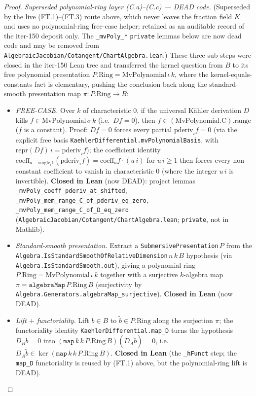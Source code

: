 \begin{proof}
  \emph{Superseded polynomial-ring layer (C.a)--(C.c) --- DEAD code.} (Superseded by the live (FT.1)--(FT.3) route above, which never leaves the fraction field \(K\) and uses no polynomial-ring free-case helper; retained as an auditable record of the iter-150 deposit only. The \texttt{\_mvPoly\_*} \texttt{private} lemmas below are now dead code and may be removed from \texttt{AlgebraicJacobian/Cotangent/ChartAlgebra.lean}.) These three sub-steps were closed in the iter-150 Lean tree and transferred the kernel question from \(B\) to its free polynomial presentation \(P.\mathrm{Ring} = \mathrm{MvPolynomial}\,\iota\,k\), where the kernel-equals-constants fact is elementary, pushing the conclusion back along the standard-smooth presentation map \(\pi \colon P.\mathrm{Ring} \to B\):
  \begin{itemize}
    \item[(C.a)] \emph{FREE-CASE.} Over \(k\) of characteristic \(0\), if the universal K\"ahler derivation \(D\) kills \(f \in \mathrm{MvPolynomial}\,\sigma\,k\) (i.e.\ \(D f = 0\)), then \(f \in (\mathrm{MvPolynomial.C}).\mathrm{range}\) (\(f\) is a constant). Proof: \(D f = 0\) forces every partial \(\mathrm{pderiv}_i f = 0\) (via the explicit free basis \texttt{KaehlerDifferential.mvPolynomialBasis}, with \(\mathrm{repr}(D f)\,i = \mathrm{pderiv}_i f\)); the coefficient identity \(\mathrm{coeff}_{u - \mathrm{single}_i 1}(\mathrm{pderiv}_i f) = \mathrm{coeff}_u f \cdot (u\,i)\) for \(u\,i \geq 1\) then forces every non-constant coefficient to vanish in characteristic \(0\) (where the integer \(u\,i\) is invertible). \textbf{Closed in Lean} (now DEAD): project lemmas \texttt{\_mvPoly\_coeff\_pderiv\_at\_shifted}, \texttt{\_mvPoly\_mem\_range\_C\_of\_pderiv\_eq\_zero}, \texttt{\_mvPoly\_mem\_range\_C\_of\_D\_eq\_zero} (\texttt{AlgebraicJacobian/Cotangent/ChartAlgebra.lean}; \texttt{private}, not in Mathlib).
    \item[(C.b)] \emph{Standard-smooth presentation.} Extract a \texttt{SubmersivePresentation}\,\(P\) from the \texttt{Algebra.IsStandardSmoothOfRelativeDimension}\,\(n\)\,\(k\)\,\(B\) hypothesis (via \texttt{Algebra.IsStandardSmooth.out}), giving a polynomial ring \(P.\mathrm{Ring} = \mathrm{MvPolynomial}\,\iota\,k\) together with a surjective \(k\)-algebra map \(\pi = \mathtt{algebraMap}\,P.\mathrm{Ring}\,B\) (surjectivity by \texttt{Algebra.Generators.algebraMap\_surjective}). \textbf{Closed in Lean} (now DEAD).
    \item[(C.c)] \emph{Lift \(+\) functoriality.} Lift \(b \in B\) to \(\tilde b \in P.\mathrm{Ring}\) along the surjection \(\pi\); the functoriality identity \texttt{KaehlerDifferential.map\_D} turns the hypothesis \(D_B b = 0\) into \((\mathtt{map}\,k\,k\,P.\mathrm{Ring}\,B)(D_A \tilde b) = 0\), i.e.\ \(D_A \tilde b \in \ker(\mathtt{map}\,k\,k\,P.\mathrm{Ring}\,B)\). \textbf{Closed in Lean} (the \texttt{\_hFunct} step; the \texttt{map\_D} functoriality is reused by (FT.1) above, but the polynomial-ring lift is DEAD).
  \end{itemize}


\end{proof}
